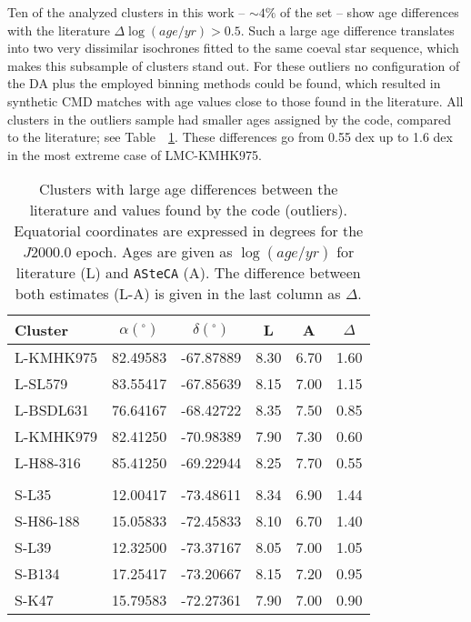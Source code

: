 \documentclass[draft]{aa}
\begin{document}
\begin{appendix}
Ten of the analyzed clusters in this work -- ${\sim}4\%$ of the set -- show age
differences with the literature $\Delta\log(age/yr){>}0.5$.
Such a large age difference translates into two very dissimilar isochrones
fitted to the same coeval star sequence, which makes this subsample of
clusters stand out.
%
For these outliers no configuration of the DA plus the employed binning
methods could be found, which resulted in synthetic CMD matches with age values
close to those found in the literature.
%
All clusters in the outliers sample had smaller ages assigned by the code,
compared to the literature; see Table~~\ref{tab:outliers}. These
differences go from 0.55 dex up to 1.6 dex in the most extreme case of
LMC-KMHK975.

\begin{table}
\centering
\caption{Clusters with large age differences between the literature
and values found by the code (outliers).
Equatorial coordinates are expressed in degrees for the $J2000.0$ epoch.
Ages are given as $\log(age/yr)$ for literature (L) and \texttt{ASteCA} (A).
The difference between both estimates (L-A) is given in the last column as
$\Delta$.}
\label{tab:outliers}
\begin{tabular}{lccccc}
\hline\hline
Cluster & $\alpha(^\circ)$ & $\delta(^\circ)$ & L & A & $\Delta$\\
\hline
L-KMHK975 & 82.49583 & -67.87889 & 8.30 & 6.70 & 1.60\\
L-SL579 & 83.55417 & -67.85639 & 8.15 & 7.00 & 1.15\\
L-BSDL631 & 76.64167 & -68.42722 & 8.35 & 7.50 & 0.85\\
L-KMHK979 & 82.41250 & -70.98389 & 7.90 & 7.30 & 0.60\\
L-H88-316 & 85.41250 & -69.22944 & 8.25 & 7.70 & 0.55\\
\\[-1.85ex]
S-L35 & 12.00417 & -73.48611 & 8.34 & 6.90 & 1.44\\
S-H86-188 & 15.05833 & -72.45833 & 8.10 & 6.70 & 1.40\\
S-L39 & 12.32500 & -73.37167 & 8.05 & 7.00 & 1.05\\
S-B134 & 17.25417 & -73.20667 & 8.15 & 7.20 & 0.95\\
S-K47 & 15.79583 & -72.27361 & 7.90 & 7.00 & 0.90\\
\hline
\end{tabular}
\end{table}


\end{appendix}
\end{document}
